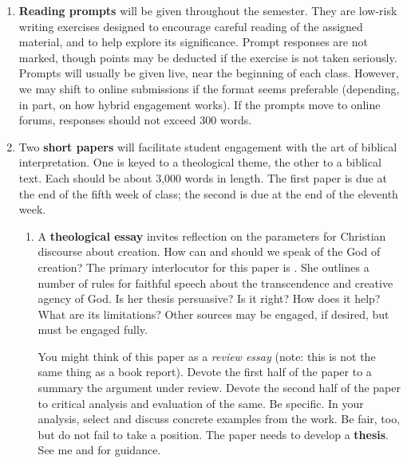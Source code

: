 \documentclass[titlepage]{article}
\begin{document}
\begin{enumerate}

	\item \textbf{Reading prompts} will be given throughout the
	semester. They are low-risk writing exercises designed to encourage
	careful reading of the assigned material, and to help explore its
	significance. Prompt responses are not marked, though points may be
	deducted if the exercise is not taken seriously. Prompts will
	usually be given live, near the beginning of each class. However, we
	may shift to online submissions if the format seems preferable
	(depending, in part, on how hybrid engagement works). If the prompts
	move to online forums, responses should not exceed 300 words.

	\item Two \textbf{short papers} will facilitate student engagement
	with the art of biblical interpretation. One is keyed to a
	theological theme, the other to a biblical text. Each should be
	about 3,000 words in length. The first paper is due at the end of
	the fifth week of class; the second is due at the end of the
	eleventh week.


	\begin{enumerate}

		\item A \textbf{theological essay} invites reflection on the
		parameters for Christian discourse about creation. How can and
		should we speak of the God of creation? The primary interlocutor
		for this paper is \cite{kt}. She outlines a number of rules for
		faithful speech about the transcendence and creative agency of
		God. Is her thesis persuasive? Is it right? How does it help?
		What are its limitations? Other sources may be engaged, if
		desired, but \cite{kt} must be engaged fully.

		You might think of this paper as a \emph{review essay} (note:
		this is not the same thing as a book report). Devote the first
		half of the paper to a summary the argument under review. Devote
		the second half of the paper to critical analysis and evaluation
		of the same. Be specific. In your analysis, select and discuss
		concrete examples from the work. Be fair, too, but do not fail
		to take a position. The paper needs to develop a
		\textbf{thesis}. See me and \cite[chs 3, 5–7, 11]{rlgs} for
		guidance.


\end{enumerate}
\end{enumerate}
\end{document}
